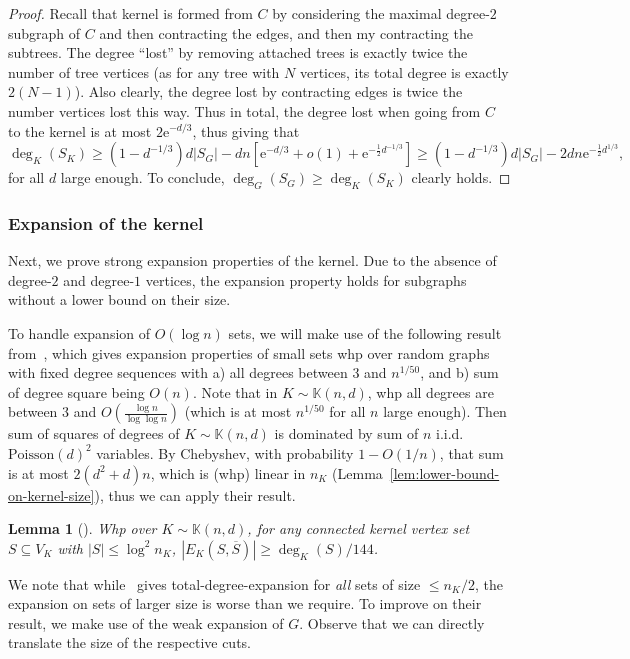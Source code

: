\documentclass[11pt]{article}
\theoremstyle{plain}
\newtheorem{lemma}[theorem]{Lemma}
\newcommand{\emm}{\mathrm{e}}
\newcommand{\1}{\mathbb{1}}
\newcommand{\Kb}{\mathbb{K}}
\newcommand{\Poisson}{\text{Poisson}}
\begin{document}
\begin{proof}
    Recall that kernel is formed from \(C\) by considering the maximal degree-\(2\) subgraph of \(C\) and then contracting the edges, and then my contracting the subtrees. The degree ``lost'' by removing attached trees is exactly twice the number of tree vertices (as for any tree with \(N\) vertices, its total degree is exactly \(2(N-1)\)). Also clearly, the degree lost by contracting edges is twice the number vertices lost this way.
    Thus in total, the degree lost when going from \(C\) to the kernel is at most \(2\emm^{-d/3}\), thus giving that
    \[\deg_K(S_K) \geq (1-d^{-1/3})d|S_G|-dn[\emm^{-d/3}+o(1) + \emm^{-\frac 12d^{-1/3}}]\geq (1-d^{-1/3})d|S_G|-2dn\emm^{-\frac{1}{2}d^{1/3}},\]
    for all \(d\) large enough. To conclude, \(\deg_G(S_G)\geq \deg_K(S_K)\) clearly holds.
\end{proof}

\subsubsection{Expansion of the kernel}

Next, we prove strong expansion properties of the kernel. Due to the absence of degree-\(2\) and degree-\(1\) vertices, the expansion property holds for subgraphs without a lower bound on their size.

To handle expansion of \(O(\log n)\) sets, we will make use of the following result from~\cite{GALANIS2022104894}, which gives expansion properties of small sets whp over random graphs with fixed degree sequences with a) all degrees between \(3\) and \(n^{1/50}\), and b) sum of degree square being \(O(n)\). Note that in \(K\sim\Kb(n,d)\), whp all degrees are between \(3\) and \(O(\frac{\log n}{\log \log n})\) (which is at most \(n^{1/50}\) for all \(n\) large enough). Then sum of squares of degrees of \(K\sim\Kb(n,d)\) is dominated by sum of \(n\) i.i.d. \(\Poisson(d)^2\) variables. By Chebyshev, with probability \(1-O(1/n)\), that sum is at most \(2(d^2+d)n\), which is (whp) linear in \(n_K\) (Lemma~\ref{lem:lower-bound-on-kernel-size}), thus we can apply their result.

\begin{lemma}[{\cite[Lemma 15]{GALANIS2022104894}}]\label{lem:small-set-expansion}
    Whp over \(K\sim\Kb(n,d)\), for any connected \emph{kernel} vertex set \(S\subseteq V_K\) with \(|S|\leq\log^2 n_K\), \(|E_K(S,\overline S)|\geq \deg_K(S) / 144\).
\end{lemma}

We note that while~\cite{GALANIS2022104894} gives total-degree-expansion for \textit{all} sets of size \(\leq n_K/2\), the expansion on sets of larger size is worse than we require. To improve on their result, we make use of the weak expansion of \(G\). Observe that we can directly translate the size of the respective cuts.
\end{document}
